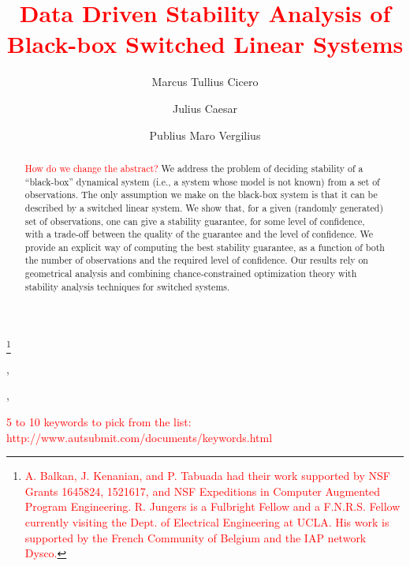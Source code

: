 \documentclass[twocolumn]{autart}
\begin{document}
\begin{frontmatter}
\title{\textcolor{red}{Data Driven Stability Analysis of Black-box Switched Linear Systems}}

\thanks[footnoteinfo]{\textcolor{red}{A. Balkan, J. Kenanian, and P. Tabuada had their work supported by NSF Grants 1645824, 1521617, and NSF Expeditions in Computer Augmented Program Engineering. R. Jungers is a Fulbright Fellow and a F.N.R.S. Fellow currently visiting the Dept. of Electrical Engineering at UCLA. His work is supported by the French Community of Belgium and the IAP network Dysco.}}

\author[UCLA]{Marcus Tullius Cicero},    %
\author[UCLA]{Julius Caesar},               %
\author[Louvain]{Publius Maro Vergilius}  %

\address[UCLA]{Department of Electrical Engineering at University of California, Los Angeles (UCLA)}  %
\address[Louvain]{\textcolor{red}{UC Louvain/Raphael's affiliation}}             %



\begin{keyword}                           %
\textcolor{red}{5 to 10 keywords to pick from the list: http://www.autsubmit.com/documents/keywords.html}   %
\end{keyword}                             %

\begin{abstract}
\textcolor{red}{How do we change the abstract?} We address the problem of deciding stability of a ``black-box'' dynamical system (i.e., a system whose model is not known) from a set of observations. The only assumption we make on the black-box system is that it can be described by a switched linear system. We show that, for a given (randomly generated) set of observations, one can give a stability guarantee, for some level of confidence, with a trade-off between the quality of the guarantee and the level of confidence. We provide an explicit way of computing the best stability guarantee, as a function of both the number of observations and the required level of confidence. Our results rely on geometrical analysis and combining chance-constrained optimization theory with stability analysis techniques for switched systems.
\end{abstract}
\end{frontmatter}
\end{document}

